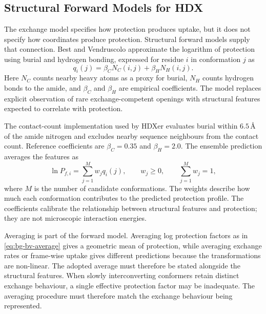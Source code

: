 \subsection{Structural Forward Models for HDX}
\label{sec:bg-hdx-forward-models}

The exchange model specifies how protection produces uptake, but it does not specify how coordinates produce protection. Structural forward models supply that connection. Best and Vendruscolo approximate the logarithm of protection using burial and hydrogen bonding, expressed for residue $i$ in conformation $j$ as
\begin{equation}
    q_i(j)=\beta_C N_C(i,j)+\beta_H N_H(i,j).
    \label{eq:bg-bv-feature}
\end{equation}
Here $N_C$ counts nearby heavy atoms as a proxy for burial, $N_H$ counts hydrogen bonds to the amide, and $\beta_C$ and $\beta_H$ are empirical coefficients.\supercite{bestStructuralInterpretationHydrogen2006} The model replaces explicit observation of rare exchange-competent openings with structural features expected to correlate with protection.

The contact-count implementation used by HDXer evaluates burial within $6.5\,\text{\AA}$ of the amide nitrogen and excludes nearby sequence neighbours from the contact count. Reference coefficients are $\beta_C=0.35$ and $\beta_H=2.0$. The ensemble prediction averages the features as
\begin{equation}
    \ln P_{f,i}=\sum_{j=1}^{M}w_jq_i(j),
    \qquad w_j\geq0,\qquad\sum_{j=1}^{M}w_j=1,
    \label{eq:bg-bv-average}
\end{equation}
where $M$ is the number of candidate conformations.\supercite{bradshawInterpretationHDXData2020} The weights describe how much each conformation contributes to the predicted protection profile. The coefficients calibrate the relationship between structural features and protection; they are not microscopic interaction energies.

Averaging is part of the forward model. Averaging log protection factors as in \cref{eq:bg-bv-average} gives a geometric mean of protection, while averaging exchange rates or frame-wise uptake gives different predictions because the transformations are non-linear. The adopted average must therefore be stated alongside the structural features. When slowly interconverting conformers retain distinct exchange behaviour, a single effective protection factor may be inadequate.\supercite{skinnerEstimatingConstraintsProtection2019} The averaging procedure must therefore match the exchange behaviour being represented.


